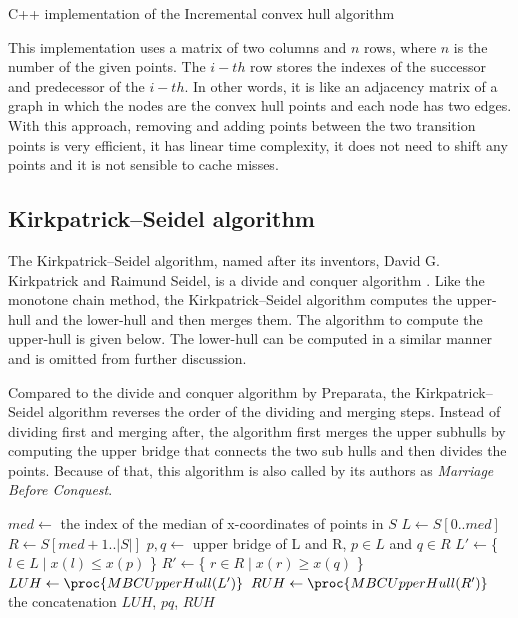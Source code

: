 \documentclass{article}
\begin{document}
\begin{listing}[H]
    \inputminted[linenos]{cpp}{code/incremental.cpp}
    \caption{C++ implementation of the Incremental convex hull algorithm}
\end{listing}

This implementation uses a matrix of two columns and $n$ rows, where $n$ is the number of the given points. The $i-th$ row stores the indexes of the successor and predecessor of the $i-th$. In other words, it is like an adjacency matrix of a graph in which the nodes are the convex hull points and each node has two edges. With this approach, removing and adding points between the two transition points is very efficient, it has linear time complexity, it does not need to shift any points and it is not sensible to cache misses.

\newpage
\subsection{Kirkpatrick–Seidel algorithm}

The Kirkpatrick–Seidel algorithm, named after its inventors, David G. Kirkpatrick and Raimund Seidel, is a divide and conquer algorithm \cite{kirkseidel}. Like the monotone chain method, the Kirkpatrick–Seidel algorithm computes the upper-hull and the lower-hull and then merges them. The algorithm to compute the upper-hull is given below. The lower-hull can be computed in a similar manner and is omitted from further discussion. 

Compared to the divide and conquer algorithm by Preparata, the Kirkpatrick–Seidel algorithm reverses the order of the dividing and merging steps. Instead of dividing first and merging after, the algorithm first merges the upper subhulls by computing the upper bridge that connects the two sub hulls and then divides the points. Because of that, this algorithm is also called by its authors as \textit{Marriage Before Conquest}.

\begin{codebox}
\li $med \gets$ the index of the median of x-coordinates of points in $S$
\li $L \gets S[0..med]$
\li $R \gets S[med+1..|S|]$
\li $p, q \gets $ upper bridge of L and R, $p\in L$ and $q\in R$
\li $L' \gets $\{ $l \in L \mid x(l) \leq x(p)$ \}
\li $R' \gets $\{ $r \in R \mid x(r) \geq x(q)$ \}
\li $LUH \gets \proc{MBCUpperHull(L')}$
\li $RUH \gets \proc{MBCUpperHull(R')}$
\li \Return the concatenation $LUH$, $pq$, $RUH$
\end{codebox}
\end{document}
